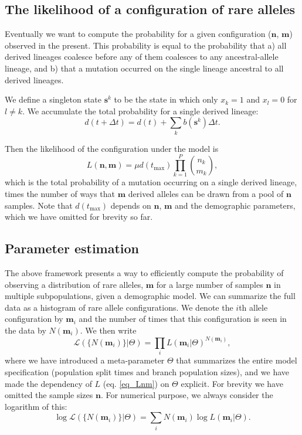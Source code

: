 \documentclass[a4paper]{article}
\begin{document}
\subsection*{The likelihood of a configuration of rare alleles}
    
Eventually we want to compute the probability for a given configuration ($\mathbf{n}$, $\mathbf{m}$) observed in the present. This probability is equal to the probability that a) all derived lineages coalesce before any of them coalesces to any ancestral-allele lineage, and b) that a mutation occurred on the single lineage ancestral to all derived lineages.

We define a singleton state $\mathbf{s}^k$ to be the state in which only $x_k=1$ and $x_l=0$ for $l\neq k$. We accumulate the total probability for a single derived lineage:
\begin{equation}
    d(t+\Delta t) = d(t) + \sum_k b(\mathbf{s}^k)\Delta t.
\end{equation}

Then the likelihood of the configuration under the model is
\begin{equation}
    \label{eq_Lnm}
    L(\mathbf{n}, \mathbf{m})=\mu d(t_\mathrm{max}) \prod_{k=1}^P \binom{n_k}{m_k},
\end{equation}
which is the total probability of a mutation occurring on a single derived lineage, times the number of ways that $\mathbf{m}$ derived alleles can be drawn from a pool of $\mathbf{n}$ samples. Note that $d(t_\mathrm{max})$ depends on $\mathbf{n}$, $\mathbf{m}$ and the demographic parameters, which we have omitted for brevity so far. 

\subsection*{Parameter estimation}
The above framework presents a way to efficiently compute the probability of observing a distribution of rare alleles, $\mathbf{m}$ for a large number of samples $\mathbf{n}$ in multiple subpopulations, given a demographic model. We can summarize the full data as a histogram of rare allele configurations. We denote the $i$th allele configuration by $\mathbf{m}_i$ and the number of times that this configuration is seen in the data by $N(\mathbf{m}_i)$. We then write
\begin{equation}
	\mathcal{L}(\{N(\mathbf{m}_i)\}|\Theta) = \prod_i L(\mathbf{m}_i|\Theta)^{N(\mathbf{m}_i)},
\end{equation}
where we have introduced a meta-parameter $\Theta$ that summarizes the entire model specification (population split times and branch population sizes), and we have made the dependency of $L$ (eq. \ref{eq_Lnm}) on $\Theta$ explicit. For brevity we have omitted the sample sizes $\mathbf{n}$. For numerical purpose, we always consider the logarithm of this:
\begin{equation}
    \label{eq_ll}
	\log\mathcal{L}(\{N(\mathbf{m}_i)\}|\Theta) = \sum_i N(\mathbf{m}_i) \log L(\mathbf{m}_i|\Theta).
\end{equation}
\end{document}
